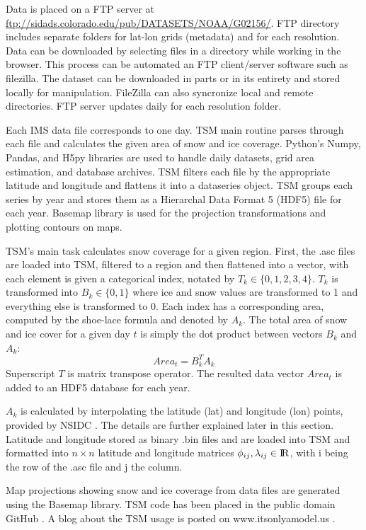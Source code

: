 Data is placed on a FTP server at \url{ftp://sidads.colorado.edu/pub/DATASETS/NOAA/G02156/}. FTP directory includes separate folders for lat-lon grids (metadata) and for each resolution. Data can be downloaded by selecting files in a directory while working in the browser. This process can be automated an FTP client/server software such as \gls{filezilla}. The dataset can be downloaded in parts or in its entirety and stored locally for manipulation. FileZilla can also syncronize local and remote directories. FTP server updates daily for each resolution folder.


Each IMS data file corresponds to one day. TSM main routine parses through each file and calculates the given area of snow and ice coverage. Python's Numpy, Pandas, and H5py libraries are used to handle daily datasets, grid area estimation, and database archives. TSM filters each file by the appropriate latitude and longitude and flattens it into a \gls{dataseries} object. TSM groups each series by year and stores them as a Hierarchal Data Format 5 (HDF5) file for each year. Basemap library is used for the projection transformations and plotting contours on maps.

TSM's main task calculates snow coverage for a given region. First, the .asc files are loaded into TSM, filtered to a region and then flattened into a vector, with each element is given a categorical index, notated by $T_k \in \{0,1,2,3,4\}$. $T_k$ is transformed into $B_k \in \{0, 1 \}$ where ice and snow values are transformed to 1 and everything else is transformed to 0. Each index has a corresponding area, computed by the shoe-lace formula and denoted by $A_k$.
The total area of snow and ice cover for a given day $t$ is simply the dot product between vectors $B_k$ and $A_k$:
\begin{equation}
Area_t  = B_k^{T}A_k
\end{equation}
Superscript $T$ is matrix transpose operator. The resulted data vector
$Area_t$ is added to an HDF5 database for each year.

$A_k$ is calculated by interpolating the latitude (lat) and longitude (lon) points, provided by NSIDC \cite{NIC}. The details are further explained later in this section. Latitude and longitude stored as binary .bin files and are loaded into TSM and formatted into $n \times n$ latitude and longitude matrices $\phi_{ij}, \lambda_{ij} \in {\rm I\!R}$, with i being the row of the .asc file and j the column.

Map projections showing snow and ice coverage from data files are generated using the Basemap library. TSM code has been placed in the public domain GitHub \cite{git_proj}. A blog about the TSM usage is posted on www.itsonlyamodel.us \cite{tibet_snow_man}.


